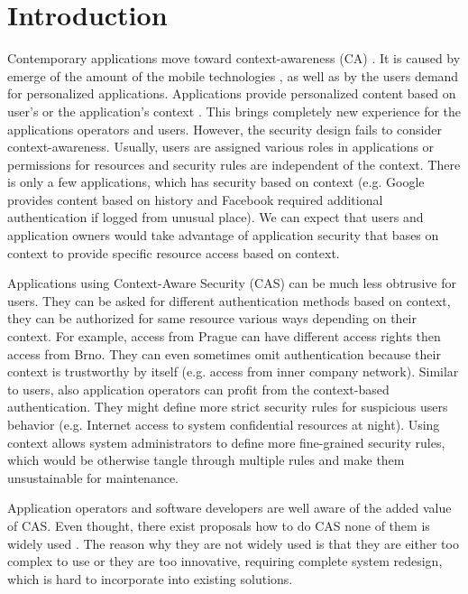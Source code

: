 \documentclass{sig-alternate}
\begin{document}



\section{Introduction}
Contemporary applications move toward context-awareness (CA) \cite{context,tomas1}. It is caused by emerge of the amount of the mobile technologies \cite{mobilecontext}, as well as by the users demand for personalized applications. Applications provide personalized content based on user's or the application's context \cite{personalizedcontext}. This brings completely new experience for the applications operators and users. However, the security design fails to consider context-awareness. Usually, users are assigned various roles in applications or permissions for resources and security rules are independent of the context. There is only a few applications, which has security based on context (e.g. Google provides content based on history and Facebook required additional authentication if logged from unusual place). We can expect that users and application owners would take advantage of application security that bases on context to provide specific resource access based on context.

Applications using Context-Aware Security (CAS) can be much less obtrusive for users. They can be asked for different authentication methods based on context, they can be authorized for same resource various ways depending on their context. For example, access from Prague can have different access rights then access from Brno. They can even sometimes omit authentication because their context is trustworthy by itself (e.g. access from inner company network). Similar to users, also application operators can profit from the context-based authentication. They might define more strict security rules for suspicious users behavior (e.g. Internet access to system confidential resources at night). Using context allows system administrators to define more fine-grained security rules, which would be otherwise tangle through multiple rules and make them unsustainable for maintenance. 

Application operators and software developers are well aware of the added value of CAS. Even thought, there exist proposals how to do CAS none of them is widely used \cite{ubiscom,envroles,hung,contextawarerbac,genericcontext,contextAwareMobile,grbac,xorbac,contextroles,eacl,contextaccess,wendong}. The reason why they are not widely used is that they are either too complex to use or they are too innovative, requiring complete system redesign, which is hard to incorporate into existing solutions.
\end{document}
